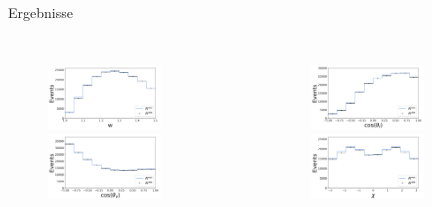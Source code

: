 \documentclass{beamer}
\begin{document}
\begin{frame}{Ergebnisse}
\begin{columns}
\begin{figure}[htbp]
   \centering
    \includegraphics[width=0.7\textwidth]{./Bilder/CLN_em1}
    \includegraphics[width=0.7\textwidth]{./Bilder/CLN_em3}
\end{figure}  
\begin{figure}[htbp]
   \centering
    \includegraphics[width=0.7\textwidth]{./Bilder/CLN_em2}
    \includegraphics[width=0.7\textwidth]{./Bilder/CLN_em4}

\end{figure}
\end{columns}
\end{frame}
\end{document}
